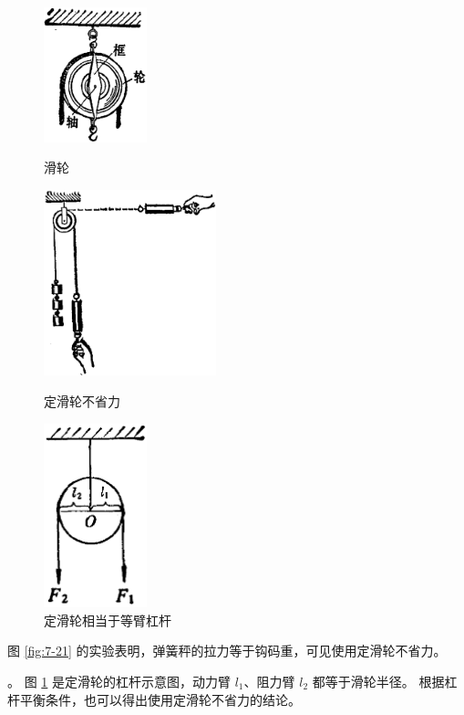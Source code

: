 \begin{figure}[htbp]
    \centering
    \begin{minipage}{4cm}
    \centering
    \vspace{6em}
    \includegraphics[width=3cm]{../pic/czwl1-ch7-20}
    \caption{滑轮}\label{fig:7-20}
    \end{minipage}
    \qquad
    \begin{minipage}{5cm}
    \centering
    \includegraphics[width=5cm]{../pic/czwl1-ch7-21}
    \caption{定滑轮不省力}\label{fig:7-21}
    \end{minipage}
    \qquad
    \begin{minipage}{4cm}
    \centering
    \includegraphics[width=3cm]{../pic/czwl1-ch7-22}
    \caption{定滑轮相当于等臂杠杆}\label{fig:7-22}
    \end{minipage}
\end{figure}

图 \ref{fig:7-21} 的实验表明，弹簧秤的拉力等于钩码重，可见使用定滑轮不省力。

。
图 \ref{fig:7-22} 是定滑轮的杠杆示意图，动力臂 $l_1$、阻力臂 $l_2$ 都等于滑轮半径。
根据杠杆平衡条件，也可以得出使用定滑轮不省力的结论。

